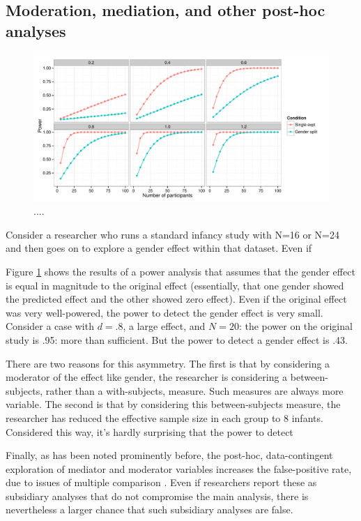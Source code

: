 \documentclass[man,noapacite]{apa2}
\begin{document}
\subsection{Moderation, mediation, and other post-hoc analyses}

\begin{figure}[t]
\centering
  \includegraphics[width=6.5in]{../plots/post_hoc.pdf}
	\caption{\label{fig:gender} .... }
\end{figure}

Consider a researcher who runs a standard infancy study with N=16 or N=24 and then goes on to explore a gender effect within that dataset. Even if 

Figure \ref{fig:gender} shows the results of a power analysis that assumes that the gender effect is equal in magnitude to the original effect (essentially, that one gender showed the predicted effect and the other showed zero effect). Even if the original effect was very well-powered, the power to detect the gender effect is very small. Consider a case with $d=.8$, a large effect, and $N=20$: the power on the original study is .95: more than sufficient. But the power to detect a gender effect is .43. 

There are two reasons for this asymmetry. The first is that by considering a moderator of the effect like gender, the researcher is considering a between-subjects, rather than a with-subjects, measure. Such measures are always more variable. The second is that by considering this between-subjects measure, the researcher has reduced the effective sample size in each group to 8 infants. Considered this way, it's hardly surprising that the power to detect 

Finally, as has been noted prominently before, the post-hoc, data-contingent exploration of mediator and moderator variables increases the false-positive rate, due to issues of multiple comparison  \cite{simonsohn2011}. Even if researchers report these as subsidiary analyses that do not compromise the main analysis, there is nevertheless a larger chance that such subsidiary analyses are false. 
\end{document}
